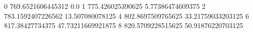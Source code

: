 0 769.6521606445312 0.0
1 775.426025390625 5.77386474609375
2 783.1592407226562 13.507080078125
4 802.8697509765625 33.21759033203125
6 817.38427734375 47.73211669921875
8 820.5709228515625 50.91876220703125
